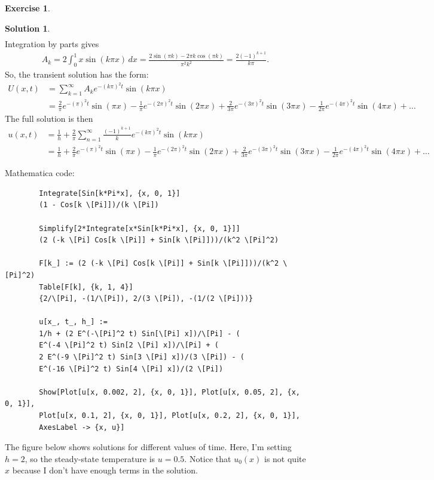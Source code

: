 \documentclass{article}
\theoremstyle{definition}
\newtheorem*{exer*}{Exercise}
\newtheorem*{sln*}{Solution}
\begin{document}
\begin{exer*}
\begin{sln*}
\begin{align*}
		\end{align*}
		Integration by parts gives
		\begin{align*}
		A_k = 2\int_{0}^1x\sin(k\pi x)\,dx = \frac{2\sin (\pi  k)-2\pi  k \cos (\pi  k)}{\pi ^2 k^2} = \frac{2(-1)^{k+1}}{k\pi}.
		\end{align*}
		So, the transient solution has the form:
		\begin{align*}
		U(x,t) &= \sum_{k=1}^\infty A_k e^{-(k\pi)^2t} \sin(k\pi x)\\
		&= \frac{2}{\pi }e^{-(\pi)^2t}\sin(\pi x) -\frac{1}{\pi }e^{-(2\pi)^2t} \sin(2\pi x) + \frac{2}{3 \pi }e^{-(3\pi)^2t} \sin(3\pi x)-\frac{1}{2 \pi }e^{-(4\pi)^2t} \sin(4\pi x) + \dots
		\end{align*}
		The full solution is then
		\begin{align*}
		u(x,t) &= \frac{1}{h} + \frac{2}{\pi}\sum_{n=1}^\infty \frac{(-1)^{k+1}}{k}e^{-(k\pi)^2t} \sin(k\pi x)\\
		&= \frac{1}{h} + \frac{2}{\pi }e^{-(\pi)^2t}\sin(\pi x) -\frac{1}{\pi }e^{-(2\pi)^2t} \sin(2\pi x) + \frac{2}{3 \pi }e^{-(3\pi)^2t} \sin(3\pi x)-\frac{1}{2 \pi }e^{-(4\pi)^2t} \sin(4\pi x) + \dots
		\end{align*}
		
		\noindent Mathematica code:\\
		\begin{lstlisting}
		Integrate[Sin[k*Pi*x], {x, 0, 1}]
		(1 - Cos[k \[Pi]])/(k \[Pi])
		
		Simplify[2*Integrate[x*Sin[k*Pi*x], {x, 0, 1}]]
		(2 (-k \[Pi] Cos[k \[Pi]] + Sin[k \[Pi]]))/(k^2 \[Pi]^2)
		
		F[k_] := (2 (-k \[Pi] Cos[k \[Pi]] + Sin[k \[Pi]]))/(k^2 \[Pi]^2)
		Table[F[k], {k, 1, 4}]
		{2/\[Pi], -(1/\[Pi]), 2/(3 \[Pi]), -(1/(2 \[Pi]))}
		
		u[x_, t_, h_] := 
		1/h + (2 E^(-\[Pi]^2 t) Sin[\[Pi] x])/\[Pi] - (
		E^(-4 \[Pi]^2 t) Sin[2 \[Pi] x])/\[Pi] + (
		2 E^(-9 \[Pi]^2 t) Sin[3 \[Pi] x])/(3 \[Pi]) - (
		E^(-16 \[Pi]^2 t) Sin[4 \[Pi] x])/(2 \[Pi])
		
		Show[Plot[u[x, 0.002, 2], {x, 0, 1}], Plot[u[x, 0.05, 2], {x, 0, 1}], 
		Plot[u[x, 0.1, 2], {x, 0, 1}], Plot[u[x, 0.2, 2], {x, 0, 1}], 
		AxesLabel -> {x, u}]
		\end{lstlisting}
		
		\noindent The figure below shows solutions for different values of time. Here, I'm setting $h=2$, so the steady-state temperature is $u = 0.5$. Notice that $u_0(x)$ is not quite $x$ because I don't have enough terms in the solution.\\
		

\end{sln*}
\end{exer*}
\end{document}
